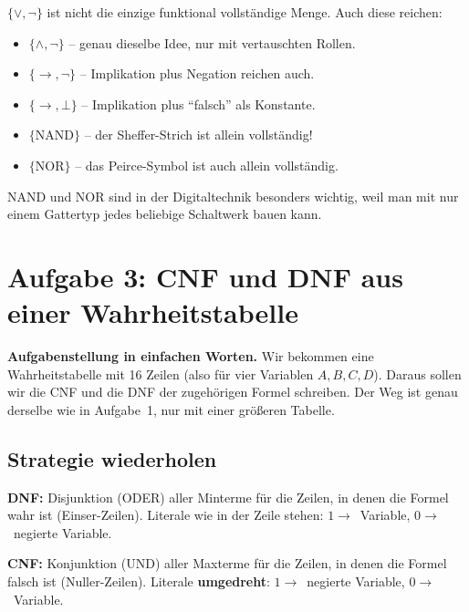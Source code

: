 \documentclass[a4paper,12pt]{article}
\begin{document}
\begin{merkbox}[title={Bonus: weitere funktional vollst\"andige Mengen}]
$\{\vee, \neg\}$ ist nicht die einzige funktional vollst\"andige
Menge. Auch diese reichen:
\begin{itemize}[nosep]
\item $\{\wedge, \neg\}$ -- genau dieselbe Idee, nur mit vertauschten
      Rollen.
\item $\{\to, \neg\}$ -- Implikation plus Negation reichen auch.
\item $\{\to, \bot\}$ -- Implikation plus "`falsch"' als Konstante.
\item $\{\text{NAND}\}$ -- der Sheffer-Strich ist allein vollst\"andig!
\item $\{\text{NOR}\}$ -- das Peirce-Symbol ist auch allein
      vollst\"andig.
\end{itemize}
NAND und NOR sind in der Digitaltechnik besonders wichtig, weil man
mit nur einem Gattertyp jedes beliebige Schaltwerk bauen kann.
\end{merkbox}

\newpage


\section*{Aufgabe 3: CNF und DNF aus einer Wahrheitstabelle}

\textbf{Aufgabenstellung in einfachen Worten.} Wir bekommen eine
Wahrheitstabelle mit 16 Zeilen (also f\"ur vier Variablen $A, B, C, D$).
Daraus sollen wir die CNF und die DNF der zugeh\"origen Formel
schreiben. Der Weg ist genau derselbe wie in Aufgabe~1, nur mit
einer gr\"o{\ss}eren Tabelle.

\subsection*{Strategie wiederholen}

\begin{merkbox}
\textbf{DNF:} Disjunktion (ODER) aller Minterme f\"ur die Zeilen, in
denen die Formel wahr ist (Einser-Zeilen). Literale wie in der Zeile
stehen: $1 \to $~Variable, $0 \to$~negierte Variable.

\medskip
\textbf{CNF:} Konjunktion (UND) aller Maxterme f\"ur die Zeilen, in
denen die Formel falsch ist (Nuller-Zeilen). Literale \textbf{umgedreht}:
$1 \to$~negierte Variable, $0 \to$~Variable.
\end{merkbox}
\end{document}
